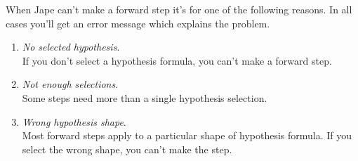 \documentclass[11pt]{book}
\begin{document}
When Jape can't make a forward step it's for one of the following reasons. In all cases you'll get an error message which explains the problem.
\begin{enumerate}
\item \emph{No selected hypothesis}. \\
If you don't select a hypothesis formula, you can't make a forward step.

\item \emph{Not enough selections}.\\
Some steps need more than a single hypothesis selection. 

\item \emph{Wrong hypothesis shape}.\\
Most forward steps apply to a particular shape of hypothesis formula. If you select the wrong shape, you can't make the step.


\end{enumerate}
\end{document}
